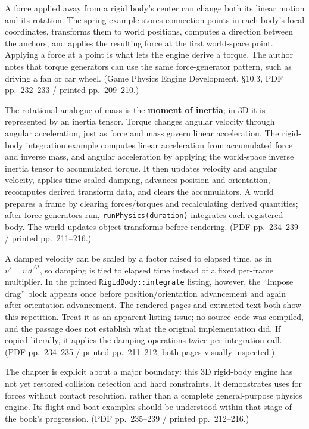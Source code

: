 \hypertarget{06-engine-ii-ch033-advance-rotation-with-torque-then-check-the-exact-integration-listing}{}

A force applied away from a rigid body's center can change both its linear motion and its rotation. The spring example stores connection points in each body's local coordinates, transforms them to world positions, computes a direction between the anchors, and applies the resulting force at the first world-space point. Applying a force at a point is what lets the engine derive a torque. The author notes that torque generators can use the same force-generator pattern, such as driving a fan or car wheel. (Game Physics Engine Development, §10.3, PDF pp.~232--233 / printed pp.~209--210.)

The rotational analogue of mass is the \textbf{moment of inertia}; in 3D it is represented by an inertia tensor. Torque changes angular velocity through angular acceleration, just as force and mass govern linear acceleration. The rigid-body integration example computes linear acceleration from accumulated force and inverse mass, and angular acceleration by applying the world-space inverse inertia tensor to accumulated torque. It then updates velocity and angular velocity, applies time-scaled damping, advances position and orientation, recomputes derived transform data, and clears the accumulators. A world prepares a frame by clearing forces/torques and recalculating derived quantities; after force generators run, \texttt{runPhysics(duration)} integrates each registered body. The world updates object transforms before rendering. (PDF pp.~234--239 / printed pp.~211--216.)

A damped velocity can be scaled by a factor raised to elapsed time, as in \(v' = v\,d^{\Delta t}\), so damping is tied to elapsed time instead of a fixed per-frame multiplier. In the printed \texttt{RigidBody::integrate} listing, however, the ``Impose drag'' block appears once before position/orientation advancement and again after orientation advancement. The rendered pages and extracted text both show this repetition. Treat it as an apparent listing issue; no source code was compiled, and the passage does not establish what the original implementation did. If copied literally, it applies the damping operations twice per integration call. (PDF pp.~234--235 / printed pp.~211--212; both pages visually inspected.)

The chapter is explicit about a major boundary: this 3D rigid-body engine has not yet restored collision detection and hard constraints. It demonstrates uses for forces without contact resolution, rather than a complete general-purpose physics engine. Its flight and boat examples should be understood within that stage of the book's progression. (PDF pp.~235--239 / printed pp.~212--216.)

